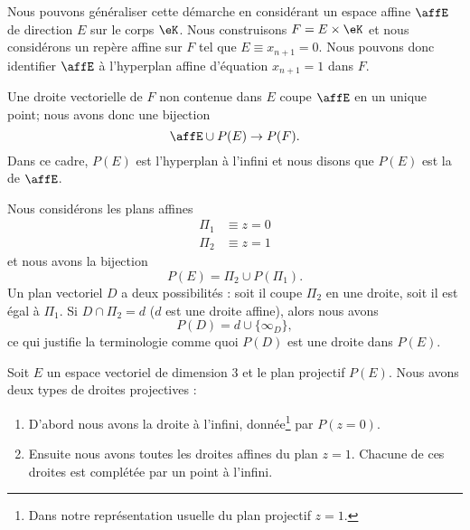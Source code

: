 Nous pouvons généraliser cette démarche en considérant un espace affine \( \affE\) de direction \( E\) sur le corps \( \eK\). Nous construisons \( F=E\times \eK\) et nous considérons un repère affine sur \( F\) tel que \( E\equiv x_{n+1}=0\). Nous pouvons donc identifier \( \affE\) à l'hyperplan affine d'équation \( x_{n+1}=1\) dans \( F\).

Une droite vectorielle de \( F\) non contenue dans \( E\) coupe \( \affE\) en un unique point; nous avons donc une bijection
\begin{equation}
	\affE\cup P(E)\to P(F).
\end{equation}
Dans ce cadre, \( P(E)\) est l'hyperplan à l'infini et nous disons que \( P(E)\) est la  de \( \affE\).

\begin{example}
	Nous considérons les plans affines
	\begin{subequations}
		\begin{align}
			\Pi_1 & \equiv z=0 \\
			\Pi_2 & \equiv z=1
		\end{align}
	\end{subequations}
	et nous avons la bijection
	\begin{equation}
		P(E)=\Pi_2\cup P(\Pi_1).
	\end{equation}
	Un plan vectoriel \( D\) a deux possibilités : soit il coupe \( \Pi_2\) en une droite, soit il est égal à \( \Pi_1\). Si \( D\cap\Pi_2=d\) (\( d\) est une droite affine), alors nous avons
	\begin{equation}
		P(D)=d\cup\{ \infty_D \},
	\end{equation}
	ce qui justifie la terminologie comme quoi \( P(D)\) est une droite dans \( P(E)\).
\end{example}

Soit \( E\) un espace vectoriel de dimension \( 3\) et le plan projectif \( P(E)\). Nous avons deux types de droites projectives :
\begin{enumerate}
	\item
	      D'abord nous avons la droite à l'infini, donnée\footnote{Dans notre représentation usuelle du plan projectif \( z=1\).} par \( P(z=0)\).
	\item
	      Ensuite nous avons toutes les droites affines du plan \( z=1\). Chacune de ces droites est complétée par un point à l'infini.
\end{enumerate}

